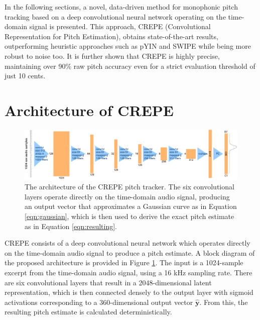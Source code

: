 In the following sections, a novel, data-driven method for monophonic pitch tracking based on a deep convolutional neural network operating on the time-domain signal is presented.
This approach, CREPE (Convolutional  Representation  for  Pitch  Estimation), obtains state-of-the-art results, outperforming heuristic approaches such as pYIN and SWIPE while being more robust to noise too.
It is further shown that CREPE is highly precise, maintaining over 90\% raw pitch accuracy even for a strict evaluation threshold of just 10 cents.

\section{Architecture of CREPE}

\begin{figure}
	\includegraphics[width=\textwidth]{architecture.pdf}
	\caption{The architecture of the CREPE pitch tracker. The six convolutional layers operate directly on the time-domain audio signal, producing an output vector that approximates a Gaussian curve as in Equation \ref{eqn:gaussian}, which is then used to derive the exact pitch estimate as in Equation \ref{eqn:resulting}.}
	\label{fig:architecture}
\end{figure}

CREPE consists of a deep convolutional neural network which operates directly on the time-domain audio signal to produce a pitch estimate.
A block diagram of the proposed architecture is provided in Figure \ref{fig:architecture}.
The input is a 1024-sample excerpt from the time-domain audio signal, using a 16 kHz sampling rate.
There are six convolutional layers that result in a 2048-dimensional latent representation, which is then connected densely to the output layer with sigmoid activations corresponding to a 360-dimensional output vector $\hat{\mathbf{y}}$.
From this, the resulting pitch estimate is calculated deterministically.

